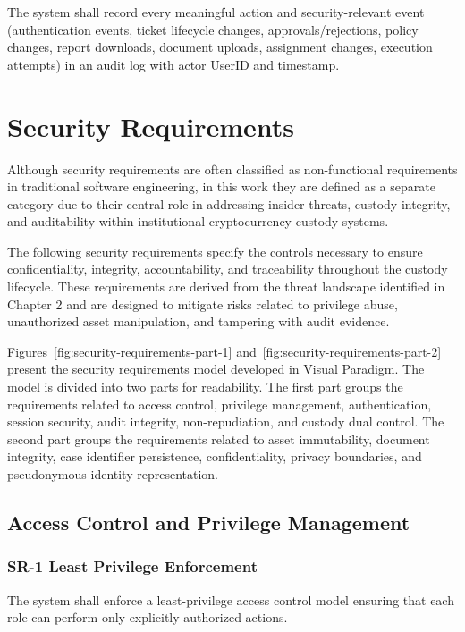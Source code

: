 \documentclass[12pt,a4paper]{report}
\begin{document}
The system shall record every meaningful action and security-relevant event (authentication events, ticket lifecycle changes, approvals/rejections, policy changes, report downloads, document uploads, assignment changes, execution attempts) in an audit log with actor UserID and timestamp.


\section{Security Requirements}

Although security requirements are often classified as non-functional requirements in traditional software engineering, in this work they are defined as a separate category due to their central role in addressing insider threats, custody integrity, and auditability within institutional cryptocurrency custody systems.

The following security requirements specify the controls necessary to ensure confidentiality, integrity, accountability, and traceability throughout the custody lifecycle. These requirements are derived from the threat landscape identified in Chapter 2 and are designed to mitigate risks related to privilege abuse, unauthorized asset manipulation, and tampering with audit evidence.

Figures~\ref{fig:security-requirements-part-1} and~\ref{fig:security-requirements-part-2}
present the security requirements model developed in Visual Paradigm. The model is divided
into two parts for readability. The first part groups the requirements related to access
control, privilege management, authentication, session security, audit integrity, non-repudiation,
and custody dual control. The second part groups the requirements related to asset
immutability, document integrity, case identifier persistence, confidentiality, privacy boundaries,
and pseudonymous identity representation.

\subsection{Access Control and Privilege Management}

\subsubsection{SR-1 Least Privilege Enforcement}

The system shall enforce a least-privilege access control model ensuring that each role can perform only explicitly authorized actions.
\end{document}
